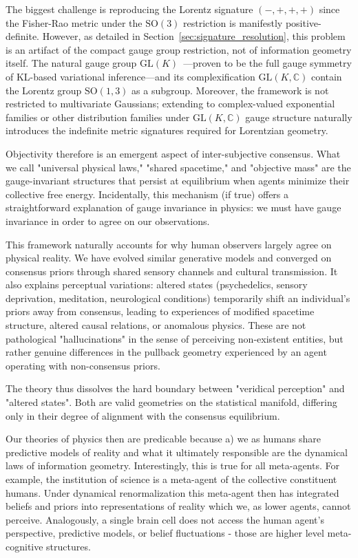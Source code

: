 \documentclass[11pt]{article}
\begin{document}
The biggest challenge is reproducing the Lorentz signature $(-,+,+,+)$ since the Fisher-Rao metric under the $\mathrm{SO}(3)$ restriction is manifestly positive-definite. However, as detailed in Section~\ref{sec:signature_resolution}, this problem is an artifact of the compact gauge group restriction, not of information geometry itself. The natural gauge group $\mathrm{GL}(K)$~\cite{Dennis2026GL}---proven to be the full gauge symmetry of KL-based variational inference---and its complexification $\mathrm{GL}(K, \mathbb{C})$ contain the Lorentz group $\mathrm{SO}(1,3)$ as a subgroup. Moreover, the framework is not restricted to multivariate Gaussians; extending to complex-valued exponential families or other distribution families under $\mathrm{GL}(K, \mathbb{C})$ gauge structure naturally introduces the indefinite metric signatures required for Lorentzian geometry.



Objectivity therefore is an emergent aspect of inter-subjective consensus. What we call "universal physical laws," "shared spacetime," and "objective mass" are the gauge-invariant structures that persist at equilibrium when agents minimize their collective free energy.  Incidentally, this mechanism (if true) offers a straightforward explanation of gauge invariance in physics: we must have gauge invariance in order to agree on our observations.

This framework naturally accounts for why human observers largely agree 
on physical reality. We have evolved similar generative models and converged on consensus priors through shared sensory channels and cultural transmission. It also explains perceptual variations: altered states (psychedelics, sensory deprivation, meditation, neurological conditions) temporarily shift an individual's priors away from consensus, leading to experiences of modified spacetime structure, altered causal relations, or anomalous physics. These are not pathological "hallucinations" in the sense of perceiving non-existent entities, but rather genuine differences in the pullback geometry experienced by an agent operating with non-consensus priors.

The theory thus dissolves the hard boundary between "veridical perception" and "altered states". Both are valid geometries on the statistical manifold, differing only in their degree of alignment with the consensus equilibrium.

Our theories of physics then are predicable because a) we as humans share predictive models of reality and what it ultimately responsible are the dynamical laws of information geometry.  Interestingly, this is true for all meta-agents.  For example, the institution of science is a meta-agent of the collective constituent humans.  Under dynamical renormalization this meta-agent then has integrated beliefs and priors into representations of reality which we, as lower agents, cannot perceive. Analogously, a single brain cell does not access the human agent's perspective, predictive models, or belief fluctuations - those are higher level meta-cognitive structures.
\end{document}

